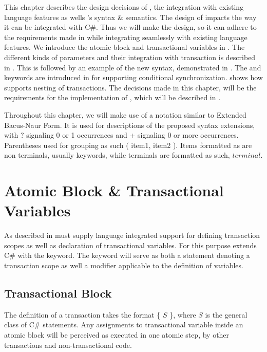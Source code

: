 \makeatletter {}\makeatother
{}
This chapter describes the design decisions of \stmname, the integration with existing language features as wells \stmname's syntax \& semantics. The design of \stmnamesp impacts the way it can be integrated with C\#. Thus we will make the design, so it can adhere to the requirements made in  while integrating seamlessly with existing language features. We introduce the atomic block and transactional variables in . The different kinds of parameters and their integration with transaction is described in . This is followed by an example of the new syntax, demonstrated in . The  and  keywords are introduced in  for supporting conditional synchronization.  shows how \stmnamesp supports nesting of transactions. The decisions made in this chapter, will be the requirements for the implementation of \stmnamesp, which will be described in .

Throughout this chapter, we will make use of a notation similar to Extended Bacus-Naur Form. It is used for descriptions of the proposed syntax extensions, with ? signaling 0 or 1 occurrences and + signaling 0 or more occurrences. Parentheses used for grouping as such ( item1, item2 ). Items formatted as  are non terminals, usually keywords, while terminals are formatted as such, $terminal$. 
\label{chap:stm_design}

\section{Atomic Block \& Transactional Variables}\label{sec:stm_design}
As described in  \stmnamesp must supply language integrated support for defining transaction scopes as well as declaration of transactional variables. For this purpose \stmnamesp extends C\# with the  keyword. The  keyword will serve as both a statement denoting a transaction scope as well a modifier applicable to the definition of variables. 

\subsection{Transactional Block}
The definition of a transaction takes the format  \{ $S$ \}, where $S$ is the general class of C\# statements. Any assignments to transactional variable inside an atomic block will be perceived as executed in one atomic step, by other transactions and non-transactional code.

